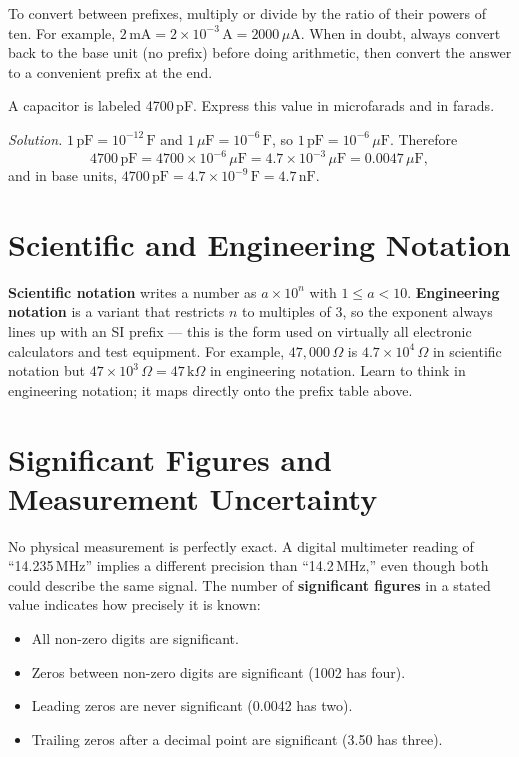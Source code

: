 \begin{keyidea}
To convert between prefixes, multiply or divide by the ratio of their
powers of ten. For example, $2\,\text{mA} = 2\times10^{-3}\,\text{A} =
2000\,\mu\text{A}$. When in doubt, always convert back to the base unit
(no prefix) before doing arithmetic, then convert the answer to a
convenient prefix at the end.
\end{keyidea}

\begin{examplebox}
A capacitor is labeled 4700\,pF. Express this value in microfarads and in
farads.

\emph{Solution.} $1\,\text{pF} = 10^{-12}\,\text{F}$ and
$1\,\mu\text{F} = 10^{-6}\,\text{F}$, so
$1\,\text{pF} = 10^{-6}\,\mu\text{F}$. Therefore
\[
4700\,\text{pF} = 4700 \times 10^{-6}\,\mu\text{F} = 4.7\times10^{-3}\,\mu\text{F} = 0.0047\,\mu\text{F},
\]
and in base units, $4700\,\text{pF} = 4.7\times10^{-9}\,\text{F} = 4.7\,\text{nF}$.
\end{examplebox}

\section{Scientific and Engineering Notation}

\textbf{Scientific notation} writes a number as $a \times 10^{n}$ with
$1 \le a < 10$. \textbf{Engineering notation} is a variant that restricts
$n$ to multiples of 3, so the exponent always lines up with an SI prefix
--- this is the form used on virtually all electronic calculators and test
equipment. For example, $47{,}000\,\Omega$ is $4.7\times10^{4}\,\Omega$ in
scientific notation but $47\times10^{3}\,\Omega = 47\,\text{k}\Omega$ in
engineering notation. Learn to think in engineering notation; it maps
directly onto the prefix table above.

\section{Significant Figures and Measurement Uncertainty}

No physical measurement is perfectly exact. A digital multimeter reading
of ``14.235\,MHz'' implies a different precision than ``14.2\,MHz,'' even
though both could describe the same signal. The number of \textbf{significant
figures} in a stated value indicates how precisely it is known:

\begin{itemize}
\item All non-zero digits are significant.
\item Zeros between non-zero digits are significant (1002 has four).
\item Leading zeros are never significant (0.0042 has two).
\item Trailing zeros after a decimal point are significant (3.50 has three).
\end{itemize}

